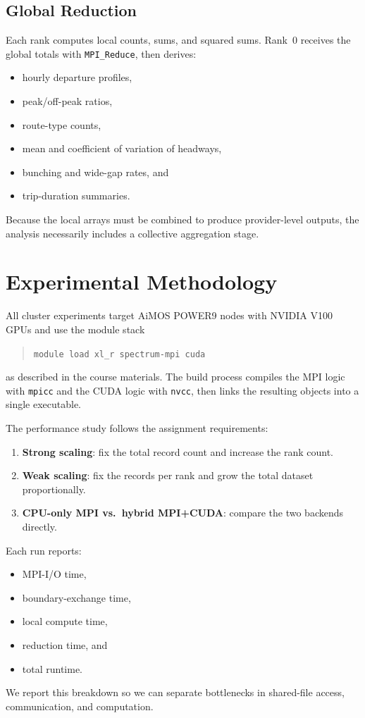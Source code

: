 \documentclass[sigconf,nonacm]{acmart}
\begin{document}
\subsection{Global Reduction}
Each rank computes local counts, sums, and squared sums. Rank~0 receives the global totals with \texttt{MPI\_Reduce}, then derives:
\begin{itemize}[leftmargin=*]
  \item hourly departure profiles,
  \item peak/off-peak ratios,
  \item route-type counts,
  \item mean and coefficient of variation of headways,
  \item bunching and wide-gap rates, and
  \item trip-duration summaries.
\end{itemize}
Because the local arrays must be combined to produce provider-level outputs, the analysis necessarily includes a collective aggregation stage.

\section{Experimental Methodology}
All cluster experiments target AiMOS POWER9 nodes with NVIDIA V100 GPUs and use the module stack
\begin{quote}
\texttt{module load xl\_r spectrum-mpi cuda}
\end{quote}
as described in the course materials. The build process compiles the MPI logic with \texttt{mpicc} and the CUDA logic with \texttt{nvcc}, then links the resulting objects into a single executable.

The performance study follows the assignment requirements:
\begin{enumerate}[leftmargin=*]
  \item \textbf{Strong scaling}: fix the total record count and increase the rank count.
  \item \textbf{Weak scaling}: fix the records per rank and grow the total dataset proportionally.
  \item \textbf{CPU-only MPI vs.\ hybrid MPI+CUDA}: compare the two backends directly.
\end{enumerate}

Each run reports:
\begin{itemize}[leftmargin=*]
  \item MPI-I/O time,
  \item boundary-exchange time,
  \item local compute time,
  \item reduction time, and
  \item total runtime.
\end{itemize}
We report this breakdown so we can separate bottlenecks in shared-file access, communication, and computation.
\end{document}
